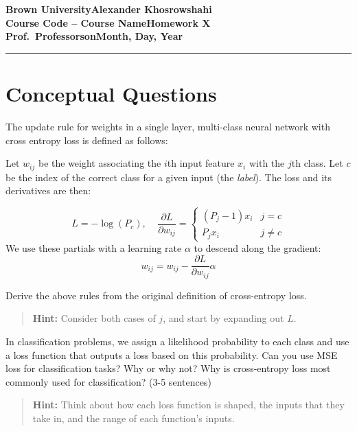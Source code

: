 \documentclass[11pt, answers]{exam}
\newcommand{\myname}{Alexander Khosrowshahi}
\newcommand{\assignment}{Homework X}
\newcommand{\duedate}{Month, Day, Year}
\begin{document}
\textbf{Brown University}\hfill\textbf{\myname}\\[0.01in]
\textbf{Course Code -- Course Name}\hfill\textbf{\assignment}\\[0.01in]
\textbf{Prof.\ Professorson}\hfill\textbf{\duedate}\\
\smallskip\hrule\bigskip

\section*{Conceptual Questions}

\begin{questions}

	\question
	The update rule for weights in a single layer, multi-class neural network with cross entropy loss is defined as follows:

	Let $w_{ij}$ be the weight associating the $i$th input feature $x_i$ with the $j$th class. Let $c$ be the index of the correct class for a given input (the {\it label}). The loss and its derivatives are then:

	$$L = -\log(P_c), \ \ \ \ \ \frac{\partial L}{\partial w_{ij}} = \begin{cases}
			(P_j - 1)x_i & j = c    \\
			P_j x_i      & j \neq c
		\end{cases}$$
	We use these partials with a learning rate $\alpha$ to descend along the gradient:
	$$w_{ij} = w_{ij} - \frac{\partial L}{\partial w_{ij}}\alpha$$

	Derive the above rules from the original definition of cross-entropy loss.

	\begin{quote}
		{\bf Hint:} Consider both cases of $j$, and start by expanding out $L$.
	\end{quote}

	\question
	In classification problems, we assign a likelihood probability to each class and use a loss function that outputs a loss based on this probability. Can you use MSE loss for classification tasks? Why or why not? Why is cross-entropy loss most commonly used for classification? (3-5 sentences)

	\begin{quote}
		{\bf Hint:} Think about how each loss function is shaped, the inputs that they take in, and the range of each function's inputs.
	\end{quote}

	\newpage %


\end{questions}
\end{document}
